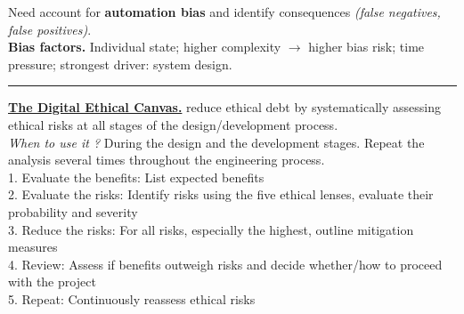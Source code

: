 \documentclass[8pt, a4paper]{extarticle}
\makeatletter
\renewcommand{\hline}{\noalign{\vskip 2px}\hrule\@height\arrayrulewidth\@width\linewidth\noalign{\vskip 2px}}
\makeatother
\begin{document}
\begin{minipage}[t]{0.48\textwidth}
{\begin{minipage}[htp]{1\textwidth}
\begin{minipage}[t]{0.49\textwidth}
				Need account for \textbf{automation bias} and identify consequences \textit{(false negatives, false positives)}.\\
				\textbf{Bias factors.} Individual state; higher complexity $\rightarrow$ higher bias risk; time pressure; strongest driver: system design.
			\end{minipage}\hline
			\ul{\textbf{The Digital Ethical Canvas.}} reduce ethical debt by systematically assessing ethical risks at all stages of the design/development process.\\
			\textit{When to use it ?} During the design and the development stages. Repeat the analysis several times throughout the engineering process.\\
			1. Evaluate the benefits: List expected benefits\\
			2. Evaluate the risks: Identify risks using the five ethical lenses, evaluate their probability and severity\\
			3. Reduce the risks: For all risks, especially the highest, outline mitigation measures\\
			4. Review: Assess if benefits outweigh risks and decide whether/how to proceed with the project\\
			5. Repeat: Continuously reassess ethical risks
		\end{minipage}}
\end{minipage}
\end{document}
